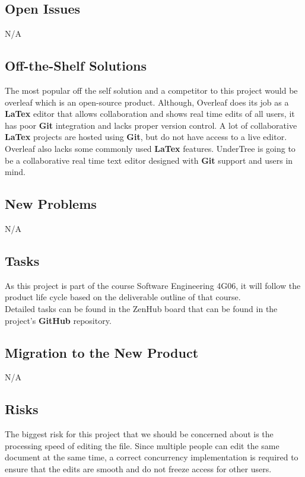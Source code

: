 \documentclass[12pt, titlepage]{article}
\begin{document}
	\subsection{Open Issues}
	
	N/A
	
	\subsection{Off-the-Shelf Solutions}
	
	The most popular off the self solution and a competitor to this project would be overleaf which is an open-source product. Although, Overleaf does its job as a \textbf{LaTex} editor that allows collaboration and shows real time edits of all users, it has poor \textbf{Git} integration and lacks proper version control. A lot of collaborative \textbf{LaTex} projects are hosted using \textbf{Git}, but do not have access to a live editor. Overleaf also lacks some commonly used \textbf{LaTex} features. UnderTree is going to be a collaborative real time text editor designed with \textbf{Git} support and users in mind.
	
	\subsection{New Problems}
	
	N/A
	
	\subsection{Tasks}
	
	As this project is part of the course Software Engineering 4G06, it will follow the product life cycle based on the deliverable outline of that course.\\
	Detailed tasks can be found in the ZenHub board that can be found in the project's \textbf{GitHub} repository.
	
	\subsection{Migration to the New Product}
	N/A
	
	\subsection{Risks}
	
	The biggest risk for this project that we should be concerned about is the processing speed of editing the file. Since multiple people can edit the same document at the same time, a correct concurrency implementation is required to ensure that the edits are smooth and do not freeze access for other users.
	
\end{document}
